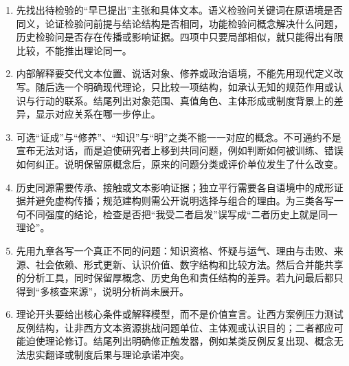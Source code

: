 \begin{enumerate}
\item 先找出待检验的“早已提出”主张和具体文本。语义检验问关键词在原语境是否同义，论证检验问前提与结论结构是否相同，功能检验问概念解决什么问题，历史检验问是否存在传播或影响证据。四项中只要局部相似，就只能得出有限比较，不能推出理论同一。
\item 内部解释要交代文本位置、说话对象、修养或政治语境，不能先用现代定义改写。随后选一个明确现代理论，只比较一项结构，如承认无知的规范作用或认识与行动的联系。结尾列出对象范围、真值角色、主体形成或制度背景上的差异，显示对应关系在哪一步停止。
\item 可选“证成”与“修养”、“知识”与“明”之类不能一一对应的概念。不可通约不是宣布无法对话，而是迫使研究者上移到共同问题，例如判断如何被训练、错误如何纠正。说明保留原概念后，原来的问题分类或评价单位发生了什么改变。
\item 历史同源需要传承、接触或文本影响证据；独立平行需要各自语境中的成形证据并避免虚构传播；规范建构则需公开说明选择与组合的理由。为三类各写一句不同强度的结论，检查是否把“我受二者启发”误写成“二者历史上就是同一理论”。
\item 先用九章各写一个真正不同的问题：知识资格、怀疑与运气、理由与击败、来源、社会依赖、形式更新、认识价值、数字结构和比较方法。然后合并能共享的分析工具，同时保留厚概念、历史角色和责任结构的差异。若九问最后都只得到“多核查来源”，说明分析尚未展开。
\item 理论开头要给出核心条件或解释模型，而不是价值宣言。让西方案例压力测试反例结构，让非西方文本资源挑战问题单位、主体观或认识目的；二者都应可能迫使理论修订。结尾列出明确修正触发器，例如某类反例反复出现、概念无法忠实翻译或制度后果与理论承诺冲突。
\end{enumerate}

